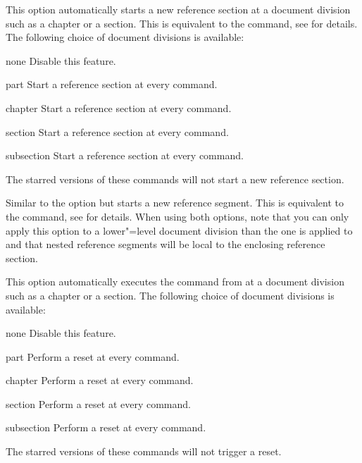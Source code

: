 \documentclass{ltxdockit}[2011/03/25]
\begin{document}
\begin{optionlist}
This option automatically starts a new reference section at a document division such as a chapter or a section. This is equivalent to the  command, see  for details. The following choice of document divisions is available:

\begin{valuelist}
\item[none] Disable this feature.
\item[part] Start a reference section at every  command.
\item[chapter] Start a reference section at every  command.
\item[section] Start a reference section at every  command.
\item[subsection] Start a reference section at every  command.
\end{valuelist}
%
The starred versions of these commands will not start a new reference section.


Similar to the  option but starts a new reference segment. This is equivalent to the  command, see  for details. When using both options, note that you can only apply this option to a lower"=level document division than the one  is applied to and that nested reference segments will be local to the enclosing reference section.


This option automatically executes the  command from  at a document division such as a chapter or a section. The following choice of document divisions is available:

\begin{valuelist}
\item[none] Disable this feature.
\item[part] Perform a reset at every  command.
\item[chapter] Perform a reset at every  command.
\item[section] Perform a reset at every  command.
\item[subsection] Perform a reset at every  command.
\end{valuelist}
%
The starred versions of these commands will not trigger a reset.


\end{optionlist}
\end{document}
